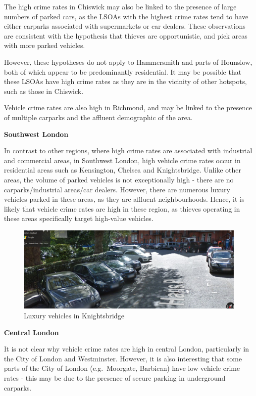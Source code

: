 \documentclass[]{article}
\begin{document}
The high crime rates in Chiswick may also be linked to the presence of
large numbers of parked cars, as the LSOAs with the highest crime rates
tend to have either carparks associated with supermarkets or car
dealers. These observations are consistent with the hypothesis that
thieves are opportunistic, and pick areas with more parked vehicles.

However, these hypotheses do not apply to Hammersmith and parts of
Hounslow, both of which appear to be predominantly residential. It may
be possible that these LSOAs have high crime rates as they are in the
vicinity of other hotspots, such as those in Chiswick.

Vehicle crime rates are also high in Richmond, and may be linked to the
presence of multiple carparks and the affluent demographic of the area.

\textbf{Southwest London}

In contrast to other regions, where high crime rates are associated with
industrial and commercial areas, in Southwest London, high vehicle crime
rates occur in residential areas such as Kensington, Chelsea and
Knightsbridge. Unlike other areas, the volume of parked vehicles is not
exceptionally high - there are no carparks/industrial areas/car dealers.
However, there are numerous luxury vehicles parked in these areas, as
they are affluent neighbourhoods. Hence, it is likely that vehicle crime
rates are high in these region, as thieves operating in these areas
specifically target high-value vehicles.

\begin{figure}
\centering
\includegraphics{pictures/Knightsbridge.png}
\caption{Luxury vehicles in Knightsbridge}
\end{figure}

\textbf{Central London}

It is not clear why vehicle crime rates are high in central London,
particularly in the City of London and Westminster. However, it is also
interesting that some parts of the City of London (e.g.~Moorgate,
Barbican) have low vehicle crime rates - this may be due to the presence
of secure parking in underground carparks.
\end{document}
